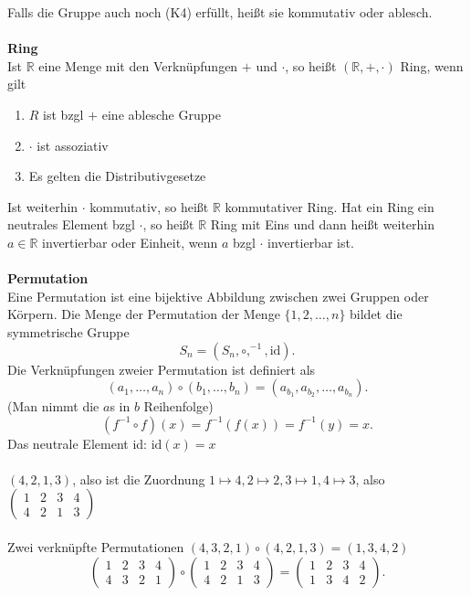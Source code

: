 \documentclass[a4paper,12pt]{article}
\numberwithin{equation}{section}
\begin{document}
Falls die Gruppe auch noch (K4) erfüllt, heißt sie kommutativ oder ablesch.
\\\hfill\\\textbf{Ring}\\ 
Ist $\mathbb{R}$ eine Menge mit den Verknüpfungen $+$ und $\cdot $, so heißt $\left(\mathbb{R},+,\cdot \right)$ Ring, wenn gilt
\begin{enumerate}[label=(\alph*)]
        \item ${R}$ ist bzgl $+$ eine ablesche Gruppe
        \item $\cdot $ ist assoziativ
        \item Es gelten die Distributivgesetze
\end{enumerate}
Ist weiterhin $\cdot $ kommutativ, so heißt $\mathbb{R}$ kommutativer Ring. Hat ein Ring ein neutrales Element bzgl $\cdot $, so heißt $\mathbb{R}$ Ring mit Eins und dann heißt weiterhin $a \in \mathbb{R}$ invertierbar oder Einheit, wenn $a$ bzgl $\cdot $ invertierbar ist.
\\\hfill\\\textbf{Permutation}\\
Eine Permutation ist eine bijektive Abbildung zwischen zwei Gruppen oder Körpern. Die Menge der Permutation der Menge $\{1,2,\hdots,n\}$ bildet die symmetrische Gruppe
\[
        S_{n}=\left( S_n,\circ,^{-1},\text{id}\right)
.\]
Die Verknüpfungen zweier Permutation ist definiert als
\[ 
        \left( a_1,\hdots,a_n\right) \circ\left( b_1,\hdots,b_n\right) =\left( a_{b_{1}},a_{b_{2}},\hdots,a_{b_{n}}\right) 
.\] 
(Man nimmt die $a$s in $b$ Reihenfolge)
\[ 
        \left( f^{-1}\circ f\right) \left( x\right) =f^{-1}\left( f\left( x\right) \right) =f^{-1}\left( y\right) =x
.\] 
Das neutrale Element id: $\text{id}\left( x\right) =x$\\\\ 
$\left( 4,2,1,3\right) $, also ist die Zuordnung $1\mapsto 4,2\mapsto 2,3\mapsto 1,4\mapsto 3 $, also $\left(
        \begin{matrix}
                1&2&3&4\\
                4&2&1&3
        \end{matrix}
\right)
$\\\\
Zwei verknüpfte Permutationen $\left( 4,3,2,1\right) \circ\left( 4,2,1,3\right) =\left( 1,3,4,2\right) $ 
\[ 
\left(
        \begin{matrix}
                1&2&3&4\\
                4&3&2&1
        \end{matrix}
\right)
\circ
\left( 
        \begin{matrix}
                1&2&3&4\\
                4&2&1&3
        \end{matrix}
\right) 
=
\left( 
        \begin{matrix}
                1&2&3&4\\
                1&3&4&2
        \end{matrix}
\right) 
.\] 
\end{document}
